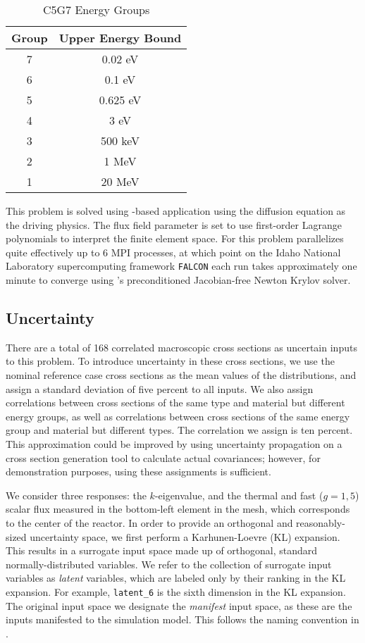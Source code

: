 \begin{table}
  \centering{}
  \begin{tabular}{c c}
    Group & Upper Energy Bound \\ \hline
    7 & 0.02 eV\\
    6 & 0.1 eV\\
    5 & 0.625 eV\\
    4 & 3 eV\\
    3 & 500 keV \\
    2 & 1 MeV \\
    1 & 20 MeV
  \end{tabular}
  \caption{C5G7 Energy Groups}
  \label{tab:c5g7 energy}
\end{table}
This problem is solved using \moose{}-based application \rattlesnake{} \cite{rattlesnake} using the diffusion
equation as the driving physics.  The flux field parameter is set to use first-order Lagrange polynomials to
interpret the finite element space.  For this problem \rattlesnake{} parallelizes quite effectively up to 6
MPI processes, at which point on the Idaho National Laboratory supercomputing framework \texttt{FALCON} each
run takes approximately one minute to converge using \moose{}'s preconditioned Jacobian-free Newton Krylov
solver.

\subsection{Uncertainty}
There are a total of 168 correlated macroscopic cross sections as uncertain inputs to this problem.  To
introduce uncertainty in these cross sections, we use the nominal reference case cross sections as the mean
values of the distributions, and assign a standard deviation of five percent to all inputs.  We also assign
correlations between cross sections of the same type and material but different energy groups, as well as
correlations between cross sections of the same energy group and material but different types.  The
correlation we assign is ten percent.  This approximation could be improved by using uncertainty propagation
on a cross section generation tool to calculate actual covariances; however, for demonstration purposes, using
these assignments is sufficient.

We consider three responses: the $k$-eigenvalue, and the thermal and fast ($g=1,5$) scalar flux measured in the
bottom-left element in the mesh, which corresponds to the center of the reactor.  In order to provide an
orthogonal and reasonably-sized uncertainty space, we first perform a Karhunen-Loevre (KL) \cite{karhunen}
expansion.  This results in a surrogate input space made up of orthogonal, standard normally-distributed
variables.  We refer to the collection of surrogate input variables as \emph{latent} variables, which are
labeled only by their ranking in the KL expansion.  For example, \texttt{latent\_6} is the sixth dimension in
the KL expansion.  The original input space we designate the \emph{manifest} input space, as these are the
inputs manifested to the simulation model.  This follows the naming convention in \raven{}.

